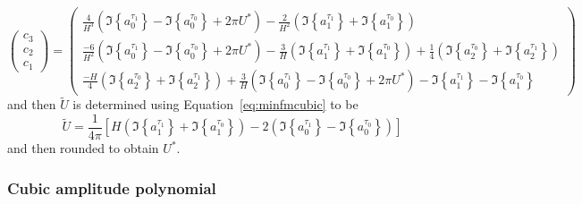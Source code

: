 \documentclass[letterpaper,12pt]{report}
\begin{document}
\[
    \begin{pmatrix}
        c_{3} \\
        c_{2} \\
        c_{1}
    \end{pmatrix}
    =
    \begin{pmatrix}
        \frac{4}{H^3} \left( \Im \left\{ a^{\tau_1}_0 \right\}
            - \Im \left\{ a^{\tau_0}_0 \right\} + 2 \pi U^{\ast} \right)
        - \frac{2}{H^{2}} \left( \Im \left\{ a^{\tau_1}_1 \right\}
            + \Im \left\{ a^{\tau_0}_1 \right\} \right) \\
        \frac{-6}{H^2} \left( \Im \left\{ a^{\tau_1}_0 \right\}
            - \Im \left\{ a^{\tau_0}_0 \right\} + 2 \pi U^{\ast} \right)
        - \frac{3}{H} \left( \Im \left\{ a^{\tau_1}_1 \right\}
            + \Im \left\{ a^{\tau_0}_1 \right\} \right)
        + \frac{1}{4}  \left( \Im \left\{ a^{\tau_0}_{2} \right\} + \Im \left\{
            a^{\tau_1}_{2} \right\} \right) \\
        \frac{-H}{4}  \left( \Im \left\{ a^{\tau_0}_{2} \right\} + \Im \left\{
            a^{\tau_1}_{2} \right\} \right) 
        + \frac{3}{H} \left( \Im \left\{ a^{\tau_1}_0 \right\}
            - \Im \left\{ a^{\tau_0}_0 \right\} + 2 \pi U^{\ast} \right)
        -  \Im \left\{ a^{\tau_1}_1 \right\}
            - \Im \left\{ a^{\tau_0}_1 \right\}
    \end{pmatrix}
\]
and then $\tilde{U}$ is determined using Equation~\ref{eq:minfmcubic} to be
\[
    \tilde{U} = \frac{1}{4 \pi} \left[ H \left( \Im \left\{ a^{\tau_1}_1
            \right\} + \Im \left\{
        a^{\tau_0}_1 \right\} \right)
        -2 \left( \Im \left\{ a^{\tau_1}_0 \right\} - \Im \left\{
        a^{\tau_0}_0 \right\} \right) \right]
\]
and then rounded to obtain $U^{\ast}$.

\subsubsection{Cubic amplitude polynomial \label{sec:cubicamppoly}}
\end{document}
